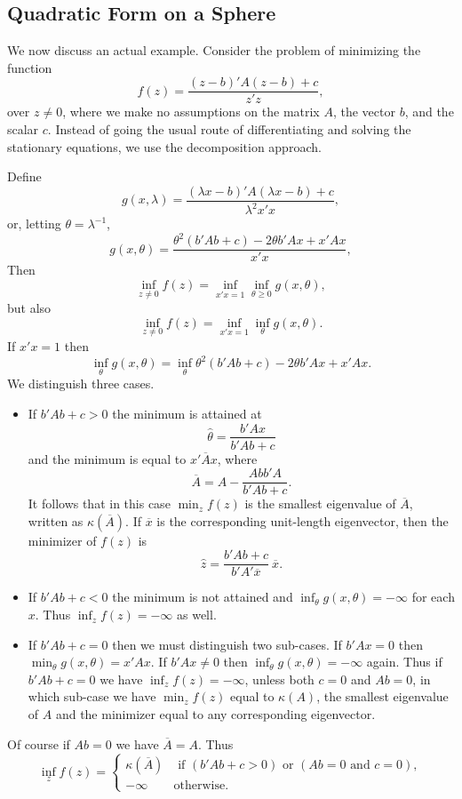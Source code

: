 \documentclass[
  12pt,
]{book}
\begin{document}
\hypertarget{quadratic-form-on-a-sphere}{%
\subsection{Quadratic Form on a Sphere}\label{quadratic-form-on-a-sphere}}

We now discuss an actual example. Consider the problem of minimizing the function
\[
f(z)=\frac{(z-b)'A(z-b)+c}{z'z},
\]
over \(z\not= 0\), where we make no assumptions on the matrix \(A\), the vector \(b\), and the
scalar \(c\). Instead of going the usual route of differentiating and solving the
stationary equations, we use the decomposition approach.

Define
\[
g(x,\lambda)=\frac{(\lambda x-b)'A(\lambda x-b)+c}{\lambda^{2}x'x},
\]
or, letting \(\theta=\lambda^{-1}\),
\[
g(x,\theta)=\frac{\theta^{2}(b'Ab+c)-2\theta b'Ax+x'Ax}{x'x},
\]
Then
\[
\inf_{z\not= 0}  f(z)=\inf_{x'x=1}\inf_{\theta\geq 0} g(x,\theta),
\]
but also
\[
\inf_{z\not= 0}  f(z)=\inf_{x'x=1}\inf_{\theta} g(x,\theta).
\]
If \(x'x=1\) then
\[
\inf_{\theta}g(x,\theta)=\inf_{\theta}\theta^{2}(b'Ab+c)-2\theta b'Ax+x'Ax.
\]
We distinguish three cases.

\begin{itemize}
\item
  If \(b'Ab+c>0\) the minimum is attained at
  \[
  \hat\theta=\frac{b'Ax}{b'Ab+c}
  \]
  and the minimum is equal to \(x'\overline Ax\), where
  \[
  \overline A=A-\frac{Abb'A}{b'Ab+c}.
  \]
  It follows that in this case \(\min_{z} f(z)\) is
  the smallest eigenvalue of \(\overline A\), written as \(\kappa(\overline A)\).
  If \(\overline{x}\) is the corresponding unit-length eigenvector, then the minimizer of \(f(z)\) is
  \[
  \hat z=\frac{b'Ab+c}{b'A'\overline x}\ \overline x.
  \]
\item
  If \(b'Ab+c<0\) the minimum is not attained and \(\inf_{\theta} g(x,\theta)=-\infty\) for
  each \(x\). Thus \(\inf_{z} f(z)=-\infty\) as well.
\item
  If \(b'Ab+c=0\) then we must distinguish two sub-cases. If \(b'Ax=0\) then \(\min_{\theta }g(x,\theta)=x'Ax\). If \(b'Ax\not=0\) then \(\inf_{\theta} g(x,\theta)=-\infty\) again.
  Thus if \(b'Ab+c=0\) we have \(\inf_{z} f(z)=-\infty\), unless both \(c=0\) and \(Ab=0\),
  in which sub-case we have \(\min_{z} f(z)\) equal to \(\kappa(A)\), the smallest eigenvalue of \(A\)
  and the minimizer equal to any corresponding eigenvector.
\end{itemize}

Of course if \(Ab=0\) we have \(\overline A=A\). Thus
\[
\inf_{z} f(z)=\begin{cases}
\kappa(\overline A)&\text{ if }(b'Ab+c>0)\text{ or }(Ab=0\text{ and }c=0),\\
-\infty&\text{otherwise}.
\end{cases}
\]
\end{document}
